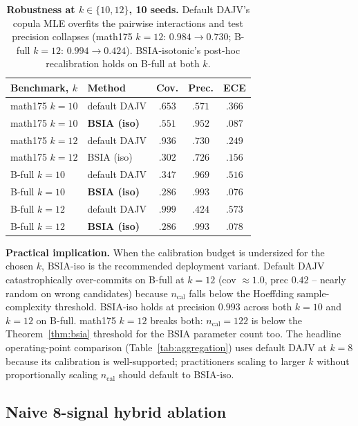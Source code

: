 \begin{table}[h]
\centering
\caption{\textbf{Robustness at $k \in \{10, 12\}$, 10 seeds.}
Default DAJV's copula MLE overfits the pairwise interactions and
test precision collapses (math175 $k=12$: $0.984 \to 0.730$;
B-full $k=12$: $0.994 \to 0.424$).  BSIA-isotonic's post-hoc
recalibration holds on B-full at both $k$.}
\label{tab:k10_robust}
\small
\setlength{\tabcolsep}{3pt}
\begin{tabular}{llccc}
\toprule
Benchmark, $k$ & Method & Cov. & Prec. & ECE \\
\midrule
math175 $k=10$ & default DAJV         & $.653$ & $.571$ & $.366$ \\
math175 $k=10$ & \textbf{BSIA (iso)}  & $.551$ & $\mathbf{.952}$ & $\mathbf{.087}$ \\
math175 $k=12$ & default DAJV         & $.936$ & $.730$ & $.249$ \\
math175 $k=12$ & BSIA (iso)           & $.302$ & $.726$ & $.156$ \\
B-full $k=10$  & default DAJV         & $.347$ & $.969$ & $.516$ \\
B-full $k=10$  & \textbf{BSIA (iso)}  & $.286$ & $\mathbf{.993}$ & $\mathbf{.076}$ \\
B-full $k=12$  & default DAJV         & $.999$ & $.424$ & $.573$ \\
B-full $k=12$  & \textbf{BSIA (iso)}  & $.286$ & $\mathbf{.993}$ & $\mathbf{.078}$ \\
\bottomrule
\end{tabular}
\end{table}

\textbf{Practical implication.} When the calibration budget is
undersized for the chosen $k$, BSIA-iso is the recommended
deployment variant.  Default DAJV catastrophically over-commits on
B-full at $k=12$ (cov $\approx 1.0$, prec $0.42$ -- nearly random
on wrong candidates) because $n_{\text{cal}}$ falls below the
Hoeffding sample-complexity threshold.  BSIA-iso holds at
precision $0.993$ across both $k = 10$ and $k = 12$ on B-full.
math175 $k=12$ breaks both: $n_{\text{cal}} = 122$ is below the
Theorem~\ref{thm:bsia} threshold for the BSIA parameter count too.
The headline operating-point comparison
(Table~\ref{tab:aggregation}) uses default DAJV at $k = 8$ because
its calibration is well-supported; practitioners scaling to
larger $k$ without proportionally scaling $n_{\text{cal}}$ should
default to BSIA-iso.

\subsection{Naive 8-signal hybrid ablation}
\label{app:hybrid_naive}

